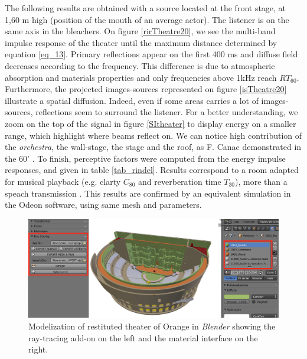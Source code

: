 \documentclass[AMA,STIX1COL]{WileyNJD-v2}
\begin{document}
The following results are obtained with a source located at the front stage, at 1,60 m high (position of the mouth of an average actor). The listener is on the same axis in the bleachers. On figure \ref{rirTheatre20}, we see the multi-band impulse response of the theater until the maximum distance determined by equation \ref{eq_13}. Primary reflections appear on the first 400 ms and diffuse field decreases according to the frequency. This difference is due to atmospheric absorption and materials properties and only frequencies above 1kHz reach $RT_{60}$. Furthermore, the projected images-sources represented on figure \ref{isTheatre20} illustrate a spatial diffusion. Indeed, even if some areas carries a lot of images-sources, reflections seem to surround the listener. For a better understanding, we zoom on the top of the signal in figure \ref{SItheater} to display energy on a smaller range, which highlight where beams reflect on. We can notice high contribution of the \textit{orchestra}, the wall-stage, the stage and the roof, as F. Canac demonstrated in the 60' \cite{canac}. To finish, perceptive factors were computed from the energy impulse responses, and given in table \ref{tab_rindel}. Results correspond to a room adapted for musical playback (e.g. clarty $C_{80}$ and reverberation time $T_{30}$), more than a speach transmission \cite{acoustique}. This results are confirmed by an equivalent simulation in the Odeon software, using same mesh and parameters.


\begin{figure}[t]
\centering
		\includegraphics[width=0.9\linewidth]{soft}
		\caption{Modelization of restituted theater of Orange \cite{theseRobin} in \textit{Blender} showing the ray-tracing add-on on the left and the material interface on the right.}
		\label{soft}
\end{figure}
\end{document}

